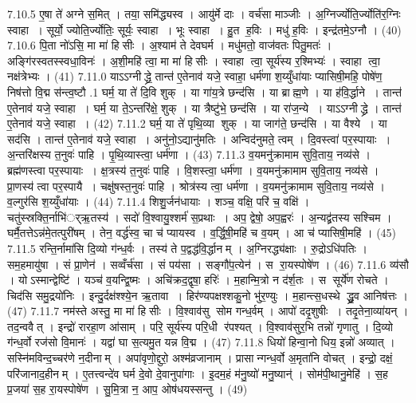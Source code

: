 7.10.5
ए॒षा ते॑ अग्ने स॒मित् । तया॒ समि॑द्ध्यस्व । आयु॑र्मे दाः । वर्च॑सा माञ्जीः । अ॒ग्निर्ज्योति॒र्ज्योति॑र॒ग्निः स्वाहा । सूर्यो॒ ज्योति॒र्ज्योतिः॒ सूर्यः॒ स्वाहा । भूः स्वाहा । हु॒त ह॒विः । मधु॑ ह॒विः । इन्द्र॑तमे॒ऽग्नौ । (40)
7.10.6
पि॒ता नो॑ऽसि॒ मा मा॑ हिसीः । अ॒श्याम॑ ते देवघर्म । मधु॑मतो॒ वाज॑वतः पितु॒मतः॑ । अङ्गि॑रस्वतस्स्वधा॒विनः॑ । अ॒शी॒महि॑ त्वा॒ मा मा॑ हिसीः । स्वाहा त्वा॒ सूर्य॑स्य र॒श्मिभ्यः॑ । स्वाहा त्वा॒ नक्ष॑त्रेभ्यः । (41)
7.11.0
याऽऽग्नीद्ध्रे॒ तान्त॑ ए॒तेनाव॑ यजे॒ स्वाहा॒ धर्म॑णा श॒य्युँधा॑याः प्यासिषी॒महि॒ पोषे॑ण॒ निष॑त्तो वि॒द्म स॑न्त्व॒ष्टौ
.1
घर्म॒ या ते॑ दि॒वि शुक् । या गा॑य॒त्रे छन्द॑सि । या ब्राह्म॒णे । या ह॑वि॒र्द्धाने । तान्त॑ ए॒तेनाव॑ यजे॒ स्वाहा । घर्म॒ या ते॒ऽन्तरि॑क्षे॒ शुक् । या त्रैष्टु॑भे॒ छन्द॑सि । या रा॑ज॒न्ये । याऽऽग्नीद्ध्रे । तान्त॑ ए॒तेनाव॑ यजे॒ स्वाहा । (42)
7.11.2
घर्म॒ या ते॑ पृथि॒व्या शुक् । या जाग॑ते॒ छन्द॑सि । या वैश्ये । या सद॑सि । तान्त॑ ए॒तेनाव॑ यजे॒ स्वाहा । अनु॑नो॒ऽद्यानु॑मतिः । अन्विद॑नुमते॒ त्वम् । दि॒वस्त्वा॑ पर॒स्पायाः । अ॒न्तरि॑क्षस्य त॒नुवः॑ पाहि । पृ॒थि॒व्यास्त्वा॒ धर्म॑णा । (43)
7.11.3
व॒यमनु॑क्रामाम सुवि॒ताय॒ नव्य॑से । ब्रह्म॑णस्त्वा पर॒स्पायाः । क्ष॒त्रस्य॑ त॒नुवः॑ पाहि । वि॒शस्त्वा॒ धर्म॑णा । व॒यमनु॑क्रामाम सुवि॒ताय॒ नव्य॑से । प्रा॒णस्य॑ त्वा पर॒स्पायै । चक्षु॑षस्त॒नुवः॑ पाहि । श्रोत्र॑स्य त्वा॒ धर्म॑णा । व॒यमनु॑क्रामाम सुवि॒ताय॒ नव्य॑से । व॒ल्गुर॑सि श॒य्युँधा॑याः । (44)
7.11.4
शिशु॒र्जन॑धायाः । शञ्च॒ वक्षि॒ परि॑ च॒ वक्षि॑ । चतु॑स्स्रक्ति॒र्नाभि॑र््ऋ॒तस्य॑ । सदो॑ वि॒श्वायु॒श्शर्म॑ स॒प्रथाः । अप॒ द्वेषो॒ अप॒ह्वरः॑ । अ॒न्यद्व्र॑तस्य सश्चिम । घर्मै॒तत्तेऽन्न॑मे॒तत्पुरी॑षम् । तेन॒ वर्द्ध॑स्व॒ चा च॑ प्यायस्व । व॒र्द्धि॒षी॒महि॑ च व॒यम् । आ च॑ प्यासिषी॒महि॑ । (45)
7.11.5
रन्ति॒र्नामा॑सि दि॒व्यो ग॑न्ध॒र्वः । तस्य॑ ते प॒द्वद्ध॑वि॒र्द्धानम् । अ॒ग्निरद्ध्य॑क्षाः । रु॒द्रोऽधि॑पतिः । सम॒हमायु॑षा । सं प्रा॒णेन॑ । सव्वँर्च॑सा । सं पय॑सा । सङ्गौ॑प॒त्येन॑ । स रा॒यस्पोषे॑ण । (46)
7.11.6
व्य॑सौ । योऽस्मान्द्वेष्टि॑ । यञ्च॑ व॒यन्द्वि॒ष्मः । अचि॑क्रद॒द्वृषा॒ हरिः॑ । म॒हान्मि॒त्रो न द॑र्\mbox{}श॒तः । स सूर्ये॑ण रोचते । चिद॑सि समु॒द्रयो॑निः । इन्दु॒र्दक्ष॑श्श्ये॒न ऋ॒तावा । हिर॑ण्यपक्षश्शकु॒नो भु॑र॒ण्युः । म॒हान्त्स॒धस्थे द्ध्रु॒व आनिष॑त्तः । (47)
7.11.7
नम॑स्ते अस्तु॒ मा मा॑ हिसीः । वि॒श्वाव॑सु सोम गन्ध॒र्वम् । आपो॑ ददृ॒शुषीः । तदृ॒तेना॒व्या॑यन् । तद॒न्ववैत् । इन्द्रो॑ रारहा॒ण आ॑साम् । परि॒ सूर्य॑स्य परि॒धी र॑पश्यत् । वि॒श्वाव॑सुर॒भि तन्नो॑ गृणातु । दि॒व्यो ग॑न्ध॒र्वो रज॑सो वि॒मानः॑ । यद्वा॑ घा स॒त्यमु॒त यन्न वि॒द्म । (47)
7.11.8
धियो॑ हिन्वा॒नो धिय॒ इन्नो॑ अव्यात् । सस्नि॑मविन्द॒च्चर॑णे न॒दीनाम् । अपा॑वृणो॒द्दुरो॒ अश्म॑व्रजानाम् । प्रासान्गन्ध॒र्वो अ॒मृता॑नि वोचत् । इन्द्रो॒ दक्षं॒ परि॑जानाद॒हीनम् । ए॒तत्त्वन्दे॑व घर्म दे॒वो दे॒वानुपा॑गाः । इ॒दम॒हं म॑नु॒ष्यो॑ मनु॒ष्यान्॑ । सोम॑पी॒थानु॒मेहि॑ । स॒ह प्र॒जया॑ स॒ह रा॒यस्पोषे॑ण । सु॒मि॒त्रा न॒ आप॒ ओष॑धयस्सन्तु । (49)
